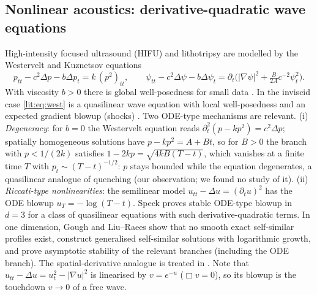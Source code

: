 \subsection{Nonlinear acoustics: derivative-quadratic wave equations}
\label{lit:acoustics}
High-intensity focused ultrasound (HIFU) and lithotripsy are modelled by the Westervelt and Kuznetsov equations
\cite{Kaltenbacher2015}
\begin{equation}\label{lit:eq:west}
  p_{tt}-c^2\Delta p-b\Delta p_t=k\,(p^2)_{tt},\qquad
  \psi_{tt}-c^2\Delta\psi-b\Delta\psi_t
  =\partial_t\big(|\nabla\psi|^2+\tfrac{B}{2A}c^{-2}\psi_t^2\big).
\end{equation}
With viscosity $b>0$ there is global well-posedness for small data
\cite{KaltenbacherLasiecka2009}. In the inviscid case \eqref{lit:eq:west}
is a quasilinear wave equation with local well-posedness and an expected
gradient blowup (shocks) \cite{DekkersRozanovaPierrat2017}. Two ODE-type
mechanisms are relevant. (i) \emph{Degeneracy}: for $b=0$ the Westervelt
equation reads $\partial_t^2(p-kp^2)=c^2\Delta p$; spatially homogeneous
solutions have $p-kp^2=A+Bt$, so for $B>0$ the branch with $p<1/(2k)$ satisfies
$1-2kp=\sqrt{4kB(T-t)}$, which vanishes
at a finite time $T$ with $p_t\sim(T-t)^{-1/2}$: $p$ stays bounded while
the equation degenerates, a quasilinear analogue of quenching (our
observation; we found no study of it). (ii) \emph{Riccati-type
nonlinearities}: the semilinear model $u_{tt}-\Delta u=(\partial_tu)^2$
has the ODE blowup $u_T=-\log(T-t)$. Speck \cite{Speck2020} proves stable
ODE-type blowup in $d=3$ for a class of quasilinear equations with such
derivative-quadratic terms. In one dimension, Gough \cite{Gough2025} and
Liu--Raees \cite{LiuRaees2025} show that no smooth exact self-similar
profiles exist, construct generalised self-similar solutions with
logarithmic growth, and prove asymptotic stability of the relevant branches
(including the ODE branch). The spatial-derivative analogue is treated in
\cite{GhoulLiuMasmoudi2025}. Note that $u_{tt}-\Delta u=u_t^2-|\nabla u|^2$
is linearised by $v=e^{-u}$ ($\Box v=0$), so its blowup is the touchdown
$v\to0$ of a free wave.

